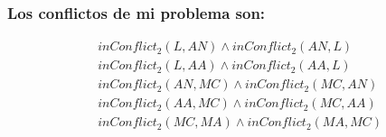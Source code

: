 \documentclass[a4paper,11pt]{article}
\begin{document}
\subsubsection{Los conflictos de mi problema son:}
\[
    \begin{aligned}
         & inConflict_2(L, AN) \land inConflict_2(AN, L)   \\
         & inConflict_2(L, AA) \land inConflict_2(AA, L)   \\
         & inConflict_2(AN, MC) \land inConflict_2(MC, AN) \\
         & inConflict_2(AA, MC) \land inConflict_2(MC, AA) \\
         & inConflict_2(MC, MA) \land inConflict_2(MA, MC) \\
    \end{aligned}
\]

\newpage
\end{document}
